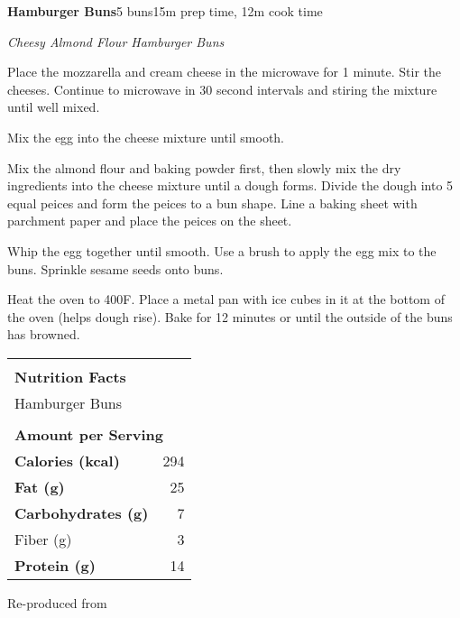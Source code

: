 \documentclass[../recipe-collections/cooking.tex]{subfiles}
\begin{document}
\begin{recipe}{\textbf{Hamburger Buns}}{5 buns}{15m prep time, 12m cook time}

  \freeform{}\textit{Cheesy Almond Flour Hamburger Buns}

  
  Place the mozzarella and cream cheese in the microwave for 1 minute. Stir the cheeses. 
  Continue to microwave in 30 second intervals and stiring the mixture until well mixed.


  Mix the egg into the cheese mixture until smooth.

  
  Mix the almond flour and baking powder first, then slowly mix the dry ingredients
  into the cheese mixture until a dough forms. Divide the dough into 5 equal peices 
  and form the peices to a bun shape. Line a baking sheet with parchment paper and place
  the peices on the sheet.


  Whip the egg together until smooth. Use a brush to apply the egg mix to the buns.
  Sprinkle sesame seeds onto buns. 

  Heat the oven to 400\0F.  Place a metal pan with ice cubes in it at the 
  bottom of the oven (helps dough rise). Bake for 12 minutes or until the 
  outside of the buns has browned.

  \bigskip
  \centering
  \begin{tabular}{|lr|}
    \hline
                                        &                                       \\
    \multicolumn{2}{|l|}{\huge{\textbf{\textrm{Nutrition Facts}}}}              \\
    \multicolumn{2}{|l|}{\textrm{Hamburger Buns}}                               \\ 
                                        &                                       \\
    \multicolumn{2}{|l|}{\footnotesize{\textbf{\textrm{Amount per Serving}}}}   \\ \hline
    \textbf{\textrm{Calories (kcal)}}   & \textrm{294}                          \\ \hline
    \textbf{\textrm{Fat (g)}}           & \textrm{25}                           \\ \hline
    \textbf{\textrm{Carbohydrates (g)}} & \textrm{7}                            \\ \hline
    \hspace{2mm} \textrm{Fiber (g)}     & \textrm{3}                            \\ \hline
    \textbf{\textrm{Protein (g)}}       & \textrm{14}                            \\ \hline
  \end{tabular}

  \freeform{}\hrulefill{}

\end{recipe}

Re-produced from  \autocite{hardesty_2021}
\end{document}
